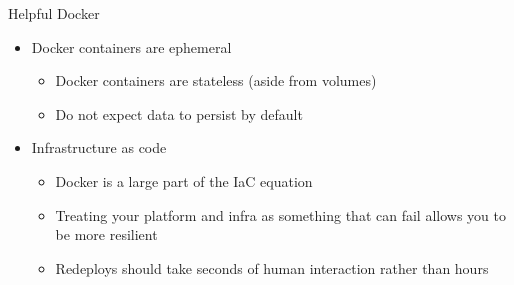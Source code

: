 \documentclass{beamer}
\begin{document}
\begin{frame}{Helpful Docker}
  \begin{itemize}
    \item Docker containers are ephemeral
      \begin{itemize}
        \item Docker containers are stateless (aside from volumes)
        \item Do not expect data to persist by default
      \end{itemize}
    \item Infrastructure as code
      \begin{itemize}
        \item Docker is a large part of the IaC equation
        \item Treating your platform and infra as something that can fail
          allows you to be more resilient
        \item Redeploys should take seconds of human interaction rather than
          hours
      \end{itemize}
  \end{itemize}
\end{frame}
\end{document}
